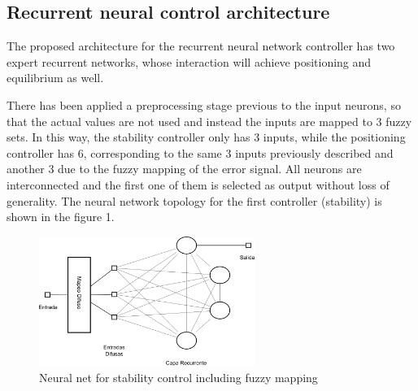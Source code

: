 \documentclass[preprint]{sigplanconf}
\begin{document}
\subsection{Recurrent neural control architecture}
The proposed architecture for the recurrent neural network controller
has two expert recurrent networks, whose interaction will achieve
positioning and equilibrium as well.

There has been applied a preprocessing stage previous to the input
neurons, so that the actual values are not used and instead the inputs
are mapped to 3 fuzzy sets. In this way, the stability controller only
has 3 inputs, while the positioning controller has 6, corresponding to
the same 3 inputs previously described and another 3 due to the fuzzy
mapping of the error signal. All neurons are interconnected and the
first one of them is selected as output without loss of
generality. The neural network topology for the first controller
(stability) is shown in the figure 1.

\begin{figure}[t]
\centering
\includegraphics[width=7cm]{rnn.png}
\caption{Neural net for stability control including fuzzy mapping}
\label{rnn}
\end{figure}

\end{document}
